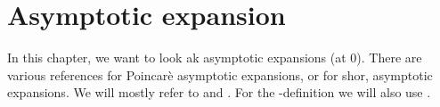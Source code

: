 \chapter{Asymptotic expansion}
\begin{comment}
  ´classical'
  \begin{itemize}
    \item \cite[60]{sabbah_cimpa90} Chapter II.2.2
      \begin{itemize}
        \item \cite{sabbah2000equations}
      \end{itemize}
    \item \textbf{\textcolor{blue}{Van der Put:
          \cite[Chapter 7]{van2003galois}: Exact Asymptotics}}
    \item \cite{majima1984asymptotic}
    \item \cite{Balser2000Formal}
    \item \cite{Loday1994}
    \item \textbf{\textcolor{blue}{\cite{Loday2014} Chapter 2}}
  \end{itemize}
  ´sheafical'
  \begin{itemize}
    \item \textbf{\textcolor{red}{\cite[II.5]{sabbah2007isomonodromic}}}
  \end{itemize}
  \TODO:
  \begin{itemize}
    \item \cite{sibuya1990Linear} Appendix A.3
  \end{itemize}
\end{comment}
In this chapter, we want to look ak asymptotic expansions (at $0$).
There are various references for Poincarè asymptotic expansions, or for shor,
asymptotic expansions.
We will mostly refer to \cite[chapter 2]{Loday2014} and
\cite[chapter 7]{van2003galois}.
For the \TODO-definition we will also use \cite{sabbah2007isomonodromic}.



